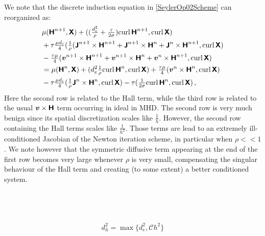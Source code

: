 \documentclass[preprint,1p]{elsarticle}
\begin{document}
\begin{remark} We note that the discrete
induction equation in \eqref{SeylerOp02Scheme} can reorganized as:
\begin{align*}
& \mu (\Hfield^{n+1}, \Htest)
+ ((\tfrac{d_e^2}{\rho} + \tfrac{\dt}{2 \conduct}) \curl{}\Hfield^{n+1},
\curl{}\Htest) \\
%
& + \dt \tfrac{\mu d_i}{4} (\tfrac{1}{\rho}
(\current^{n+1} \times \Hfield^{n+1} + \current^{n+1} \times \Hfield^{n}
+ \current^{n} \times \Hfield^{n+1}, \curl{}\Htest ) \\
%
& - \tfrac{\dt \mu}{4}(
\vel^{n+1} \times \Hfield^{n+1} + \vel^{n+1} \times \Hfield^{n}
+ \vel^{n} \times \Hfield^{n+1}, \curl{}\Htest) \\
%
&= \mu (\Hfield^{n}, \Htest)
+ (d_e^2 \tfrac{1}{\rho} \curl{}\Hfield^{n}, \curl{}\Htest)
+ \tfrac{\dt \mu}{4}(\vel^{n} \times \Hfield^{n}, \curl{}\Htest) \\
%
&- \dt \tfrac{\mu d_i}{4} (\tfrac{1}{\rho} \current^{n} \times \Hfield^{n},
\curl{}\Htest )
%
- \dt (\tfrac{1}{2 \conduct} \curl{}\Hfield^{n} , \curl{}\Htest ) \, ,
\end{align*}
Here the second row is related to the Hall term, while the third row is related
to the usual $\boldsymbol{v} \times \boldsymbol{\mathsf{H}}$ term occurring in ideal in MHD. The second
row is very much benign since its spatial discretization scales like
$\tfrac{1}{h}$. However, the second row containing the Hall terms
scales like $\tfrac{1}{h^2}$. Those terms are lead to an extremely
ill-conditioned Jacobian of the Newton iteration scheme, in particular when
$\rho < < 1$. We note however that the symmetric diffusive term appearing at
the end of the first row becomes very large whenever $\rho$ is very
small, compensating the singular behaviour of the Hall term and creating (to
some extent) a better conditioned system.
\end{remark}


 \\
 \\
 \\


\begin{align*}
 d_h^2 = \max \{d_e^2 , \mathcal{C} h^2\}
\end{align*}
\end{document}
